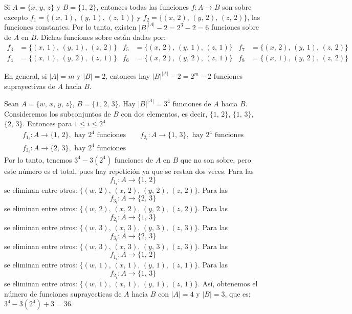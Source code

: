 \begin{myexample}
    Si $A = \{x, \, y, \, z\}$ y $B = \{ 1, \, 2 \}$, entonces todas las funciones $f: A \longrightarrow B$ son sobre excepto $f_1 = \{(x, \, 1), \, (y, \, 1), \, (z, \, 1)\}$ y $f_2 = \{(x, \, 2), \, (y, \, 2), \, (z, \, 2) \}$, las funciones constantes. Por lo tanto, existen $|B|^{|A|} - 2 = 2^3 - 2 = 6$ funciones sobre de $A$ en $B$. Dichas funciones sobre están dadas por:
    \begin{align*}
        f_3 & = \{ (x, \, 1), \, (y, \, 1), \, (z, \, 2) \} & f_5 & = \{ (x, \, 2), \, (y, \, 1), \, (z, \, 1) \} & f_7 & = \{ (x, \, 2), \, (y, \, 1), \, (z, \, 2) \} \\
        f_4 & = \{ (x, \, 1), \, (y, \, 2), \, (z, \, 1) \} & f_6 & = \{ (x, \, 2), \, (y, \, 2), \, (z, \, 1) \} & f_8 & = \{ (x, \, 1), \, (y, \, 2), \, (z, \, 2) \}
    \end{align*}
\end{myexample}

\begin{BOX}
    En general, si $|A| = m$ y $|B| = 2$, entonces hay $|B|^{|A|} - 2 = 2^m -2$ funciones suprayectivas de $A$ hacia $B$.
\end{BOX}

\begin{myexample}
    Sean $A = \{ w, \, x, \, y, \, z \}$, $B = \{ 1, \, 2, \, 3 \}$. Hay $|B|^{|A|} = 3^4$ funciones de $A$ hacia $B$. Consideremos los subconjuntos de $B$ con dos elementos, es decir, $\{ 1, \, 2 \}$, $\{ 1, \, 3 \}$, $\{ 2, \, 3 \}$. Entonces para $1 \leq i \leq 2^4$
    \begin{gather*}
        f_{1_i} : A  \longrightarrow \{1, \, 2\}, \text{ hay $2^4$ funciones} \quad \quad f_{2_i} : A \longrightarrow \{1, \, 3\}, \text{ hay $2^4$ funciones} \\
        f_{3_i} : A \longrightarrow \{2, \, 3\}, \text{ hay $2^4$ funciones}
    \end{gather*}
    Por lo tanto, tenemos $3^4 - 3(2^4)$ funciones de $A$ en $B$ que no son sobre, pero este número es el total, pues hay repetición ya que se restan dos veces. Para las
    $$f_{1_i} :A \longrightarrow \{1, \, 2 \}$$
    se eliminan entre otros: $\{ (w, \, 2), \, (x, \, 2), \, (y, \, 2), \, (z, \, 2) \}$. Para las
    $$f_{3_i}:A \longrightarrow \{ 2, \, 3\}$$
    se eliminan entre otros: $\{ (w, \, 2), \, (x, \, 2), \, (y, \, 2), \, (z, \, 2) \}$. Para las
    $$f_{2_i}:A \longrightarrow \{ 1, \, 3\}$$
    se eliminan entre otros: $\{ (w, \, 3), \, (x, \, 3), \, (y, \, 3), \, (z, \, 3) \}$. Para las
    $$f_{3_i}:A \longrightarrow \{2, \, 3\}$$
    se eliminan entre otros: $\{ (w, \, 3), \, (x, \, 3), \, (y, \, 3), \, (z, \, 3) \}$. Para las
    $$f_{1_i}:A \longrightarrow \{1, \, 2\}$$
    se eliminan entre otros: $\{ (w, \, 1), \, (x, \, 1), \, (y, \, 1), \, (z, \, 1) \}$. Para las
    $$f_{2_i}:A \longrightarrow \{1, \, 3\}$$
    se eliminan entre otros: $\{ (w, \, 1), \, (x, \, 1), \, (y, \, 1), \, (z, \, 1) \}$. Así, obtenemos el número de funciones suprayecticas de $A$ hacia $B$ con $|A| = 4$ y $|B| = 3$, que es: $3^4 - 3(2^4) + 3 = 36$.
\end{myexample}


